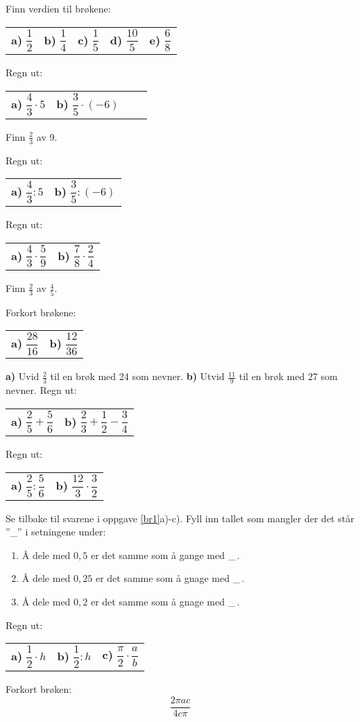 



\opgt
{}
Finn verdien til brøkene:\os
\begin{tabular}{@{}l l l l l}
	\textbf{a)} $ \dfrac{1}{2} $ & 	
	\textbf{b)} $ \dfrac{1}{4} $ & 	
	\textbf{c)} $ \dfrac{1}{5} $ &
	\textbf{d)} $ \dfrac{10}{5} $  & 
	\textbf{e)} $ \dfrac{6}{8} $
\end{tabular}
\nes

Regn ut:\os
\begin{tabular}{@{}l l l l}
	\textbf{a)} $ \dfrac{4}{3}\cdot5 $ & 	\textbf{b)} $ \dfrac{3}{5}\cdot(-6) $ 
\end{tabular}

Finn $ \frac{2}{3} $ av 9.

\nes
{}
Regn ut:\os
\begin{tabular}{@{}l l}
	\textbf{a)} $ \dfrac{4}{3}:5 $ & 	\textbf{b)} $ \dfrac{3}{5}:(-6) $
\end{tabular}

\nes
{}
Regn ut:\os
\begin{tabular}{@{}l l}
	\textbf{a)} $ \dfrac{4}{3}\cdot\dfrac{5}{9} $ & 	\textbf{b)} $ \dfrac{7}{8}\cdot\dfrac{2}{4} $ 
\end{tabular}

Finn $ \frac{2}{3} $ av $ \frac{4}{5} $.

\nes
\nes

Forkort brøkene:\os
\begin{tabular}{@{}l l}
	\textbf{a)} $ \dfrac{28}{16} $ & 	\textbf{b)} $ \dfrac{12}{36} $ 
\end{tabular}

\textbf{a)} Uvid $ \frac{2}{3} $ til en brøk med 24 som nevner.\os
\textbf{b)} Utvid $ \frac{11}{9} $ til en brøk med 27 som nevner. 
\newpage
\nes
{}
Regn ut:\os
\begin{tabular}{@{}l l }
\textbf{a)}	$ \dfrac{2}{5}+\dfrac{5}{6} $&\textbf{b)} $ \dfrac{2}{3}+\dfrac{1}{2}-\dfrac{3}{4} $
\end{tabular}

\nes
{}
Regn ut:\os
\begin{tabular}{@{}l l }
	\textbf{a)}	$ \dfrac{2}{5}:\dfrac{5}{6} $&\textbf{b)} $ \dfrac{12}{3}\cdot\dfrac{3}{2} $
\end{tabular}

Se tilbake til svarene i oppgave \ref{br1}a)-c). Fyll inn tallet som mangler der det står ''\_'' i setningene under:
{\renewcommand{\labelenumi}{(\alph{enumi})}
\begin{enumerate}
	\item Å dele med $ 0,5 $ er det samme som å gange med \_\,.
	\item Å dele med $ 0,25 $ er det samme som å gnage med \_\,.
	\item Å dele med $ 0,2 $ er det samme som å gnage med \_\,.	
	
\end{enumerate} }

Regn ut:\os
\begin{tabular}{@{}l l l}
	\textbf{a)}	$ \dfrac{1}{2}\cdot h $
	& \textbf{b)} $ \dfrac{1}{2}: h  $ 
	& \textbf{c)} $ \dfrac{\pi}{2}\cdot\dfrac{a}{b} $
\end{tabular}

Forkort brøken:
\[ \frac{2\pi a c}{4c\pi} \]


